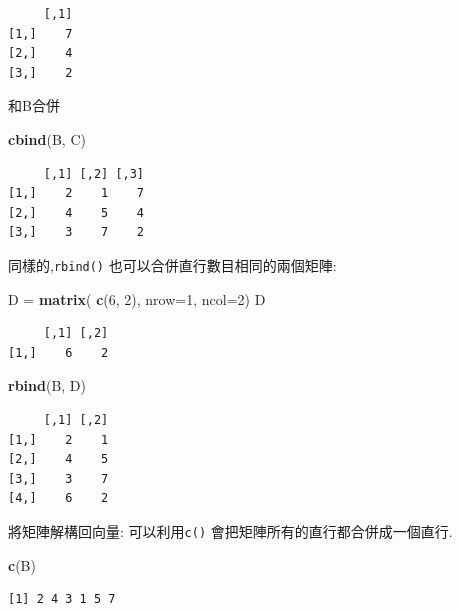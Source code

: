 \documentclass[]{book}
\newenvironment{Shaded}{\begin{snugshade}}{\end{snugshade}}
\newcommand{\DataTypeTok}[1]{\textcolor[rgb]{0.13,0.29,0.53}{#1}}
\newcommand{\DecValTok}[1]{\textcolor[rgb]{0.00,0.00,0.81}{#1}}
\newcommand{\KeywordTok}[1]{\textcolor[rgb]{0.13,0.29,0.53}{\textbf{#1}}}
\newcommand{\NormalTok}[1]{#1}
\newcommand{\StringTok}[1]{\textcolor[rgb]{0.31,0.60,0.02}{#1}}
\theoremstyle{definition}
\theoremstyle{definition}
\theoremstyle{definition}
\theoremstyle{remark}
\begin{document}
\begin{verbatim}
     [,1]
[1,]    7
[2,]    4
[3,]    2
\end{verbatim}

和B合併

\begin{Shaded}
\begin{Highlighting}[]
\KeywordTok{cbind}\NormalTok{(B, C) }
\end{Highlighting}
\end{Shaded}

\begin{verbatim}
     [,1] [,2] [,3]
[1,]    2    1    7
[2,]    4    5    4
[3,]    3    7    2
\end{verbatim}

同樣的,\texttt{rbind()} 也可以合併直行數目相同的兩個矩陣:

\begin{Shaded}
\begin{Highlighting}[]
\NormalTok{ D =}\StringTok{ }\KeywordTok{matrix}\NormalTok{( }
   \KeywordTok{c}\NormalTok{(}\DecValTok{6}\NormalTok{, }\DecValTok{2}\NormalTok{), }
   \DataTypeTok{nrow=}\DecValTok{1}\NormalTok{, }
   \DataTypeTok{ncol=}\DecValTok{2}\NormalTok{) }
\NormalTok{D}
\end{Highlighting}
\end{Shaded}

\begin{verbatim}
     [,1] [,2]
[1,]    6    2
\end{verbatim}

\begin{Shaded}
\begin{Highlighting}[]
\KeywordTok{rbind}\NormalTok{(B, D) }
\end{Highlighting}
\end{Shaded}

\begin{verbatim}
     [,1] [,2]
[1,]    2    1
[2,]    4    5
[3,]    3    7
[4,]    6    2
\end{verbatim}

將矩陣解構回向量: 可以利用\texttt{c()}
會把矩陣所有的直行都合併成一個直行.

\begin{Shaded}
\begin{Highlighting}[]
\KeywordTok{c}\NormalTok{(B) }
\end{Highlighting}
\end{Shaded}

\begin{verbatim}
[1] 2 4 3 1 5 7
\end{verbatim}
\end{document}
